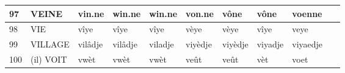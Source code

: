\documentclass[french]{article}
\begin{document}
\begin{landscape}
\begin{longtable}{|l|l|l|l|l|l|l|l||l|l|}
	97 & VEINE & vin.ne & win.ne & win.ne & von.ne & vône & vône & voenne & ~ \\ \hline
	98 & VIE & vîye & vîye & vîye & vèye & vèye & vîye & veye & ~ \\ \hline
	99 & VILLAGE & vilâdje & vilâdje & viladje & viyèdje & viyèdje & viyadje & viyaedje & ~ \\ \hline
	100 & (il) VOIT & vwèt & vwèt & vwèt & veût & veût & vèt & voet & ~ \\ \hline
\end{longtable}

\end{landscape}
\end{document}
